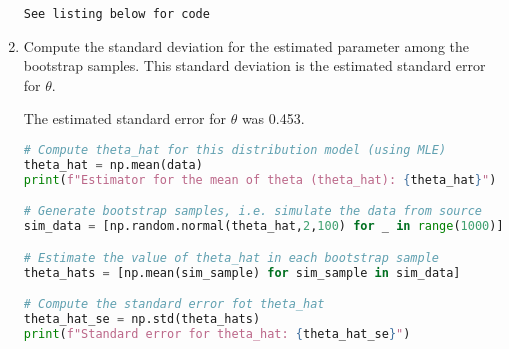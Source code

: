 \documentclass{article}
\begin{document}
\begin{enumerate}[label={(\alph*)}]
    \texttt{See listing below for code}
    
    \item Compute the standard deviation for the estimated parameter among
    the bootstrap samples. This standard deviation is the estimated standard
    error for $\theta$. 
    
    The estimated standard error for $\theta$ was 0.453.
    
\begin{lstlisting}[language=Python, caption=Parametric Bootstrap code]
# Compute theta_hat for this distribution model (using MLE)
theta_hat = np.mean(data)
print(f"Estimator for the mean of theta (theta_hat): {theta_hat}")

# Generate bootstrap samples, i.e. simulate the data from source
sim_data = [np.random.normal(theta_hat,2,100) for _ in range(1000)]

# Estimate the value of theta_hat in each bootstrap sample
theta_hats = [np.mean(sim_sample) for sim_sample in sim_data]

# Compute the standard error fot theta_hat
theta_hat_se = np.std(theta_hats)
print(f"Standard error for theta_hat: {theta_hat_se}")
\end{lstlisting}
\end{enumerate}
\pagebreak
\end{document}
